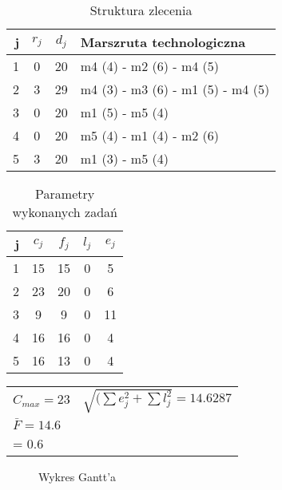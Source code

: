 

	\begin{table}[htb]
		\centering
		\caption{Struktura zlecenia}
		\begin{tabular}{ | r | c | c | l | }
		\hline
		j	& \(r_j\)	& \(d_j\)	& Marszruta technologiczna	\\ \hline
		1	& 0	& 20	& m4 (4) - m2 (6) - m4 (5)	\\ \hline
		2	& 3	& 29	& m4 (3) - m3 (6) - m1 (5) - m4 (5)	\\ \hline
		3	& 0	& 20	& m1 (5) - m5 (4)	\\ \hline
		4	& 0	& 20	& m5 (4) - m1 (4) - m2 (6)	\\ \hline
		5	& 3	& 20	& m1 (3) - m5 (4)	\\ \hline
		\end{tabular}
	\end{table}


	\begin{table}[htb]
		\centering
		\caption{Parametry wykonanych zadań}
		\begin{tabular}{ | r | c | c | c | c |}
		\hline
		j	& \(c_j\)	& \(f_j\)	& \(l_j\)	& \(e_j\)	\\ \hline
		1	& 15	& 15	& 0	& 5	\\ \hline
		2	& 23	& 20	& 0	& 6	\\ \hline
		3	& 9	& 9	& 0	& 11	\\ \hline
		4	& 16	& 16	& 0	& 4	\\ \hline
		5	& 16	& 13	& 0	& 4	\\ \hline
		\end{tabular}
	\end{table}


	\begin{table}[htb]
		\centering
		\begin{tabular}{ l l }
		\(C_{max} = 23 \)	& \(\sqrt{(\sum e_j^2 + \sum l_j^2} = 14.6287\)	\\
		\(\bar{F} = 14.6 \)	& \( \alpha*\sum e_j + \beta*\sum l_j \Big|_{\substack{\alpha = 0.4\\ \beta = 0.6}} = 12 \)	\\ 
		\end{tabular}
	\end{table}
	\begin{figure}[htb]
		\centering
		\def\svgwidth{\columnwidth}
		
		\caption{Wykres Gantt'a}
	\end{figure}
	\FloatBarrier
